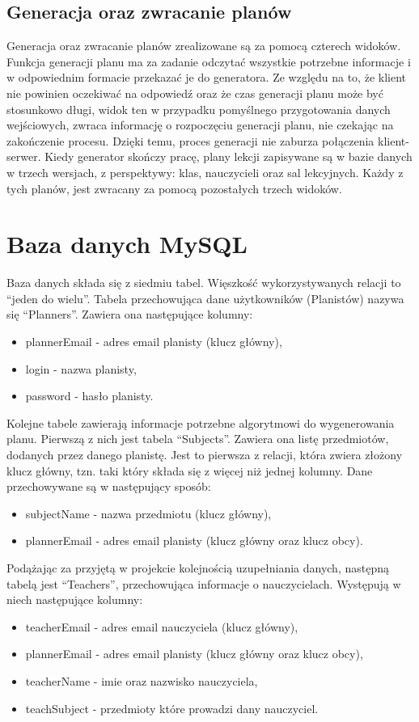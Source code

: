\subsection{Generacja oraz zwracanie planów}
Generacja oraz zwracanie planów zrealizowane są za pomocą czterech widoków. Funkcja generacji planu ma za zadanie odczytać wszystkie potrzebne informacje i w odpowiednim formacie przekazać je do generatora. Ze względu na to, że klient nie powinien oczekiwać na odpowiedź oraz że czas generacji planu może być stosunkowo długi, widok ten w przypadku pomyślnego przygotowania danych wejściowych, zwraca informację o rozpoczęciu generacji planu, nie czekając na zakończenie procesu. Dzięki temu, proces generacji nie zaburza połączenia klient-serwer. Kiedy generator skończy pracę, plany lekcji zapisywane są w bazie danych w trzech wersjach, z perspektywy: klas, nauczycieli oraz sal lekcyjnych.
Każdy z tych planów, jest zwracany za pomocą pozostałych trzech widoków.

\section{Baza danych MySQL}
Baza danych składa się z siedmiu tabel. Więszkość wykorzystywanych relacji to ``jeden do wielu''.
Tabela przechowująca dane użytkowników (Planistów) nazywa się ``Planners''. Zawiera ona następujące kolumny:
\begin{itemize}
	\item plannerEmail - adres email planisty (klucz główny),
	\item login - nazwa planisty,
	\item password - hasło planisty.
\end{itemize}

Kolejne tabele zawierają informacje potrzebne algorytmowi do wygenerowania planu. Pierwszą z nich jest tabela ``Subjects''. Zawiera ona listę przedmiotów, dodanych przez danego planistę. Jest to pierwsza z relacji, która zwiera złożony klucz główny, tzn. taki który składa się z więcej niż jednej kolumny. Dane przechowywane są w następujący sposób:
\begin{itemize}
	\item subjectName - nazwa przedmiotu (klucz główny),
	\item plannerEmail - adres email planisty (klucz główny oraz klucz obcy).
\end{itemize}

Podążając za przyjętą w projekcie kolejnością uzupełniania danych, następną tabelą jest ``Teachers'', przechowująca informacje o nauczycielach. Występują w niech następujące kolumny:
\begin{itemize}
 	\item teacherEmail - adres email nauczyciela (klucz główny),
 	\item plannerEmail - adres email planisty (klucz główny oraz klucz obcy),
 	\item teacherName - imie oraz nazwisko nauczyciela,
 	\item teachSubject - przedmioty które prowadzi dany nauczyciel.
\end{itemize}


